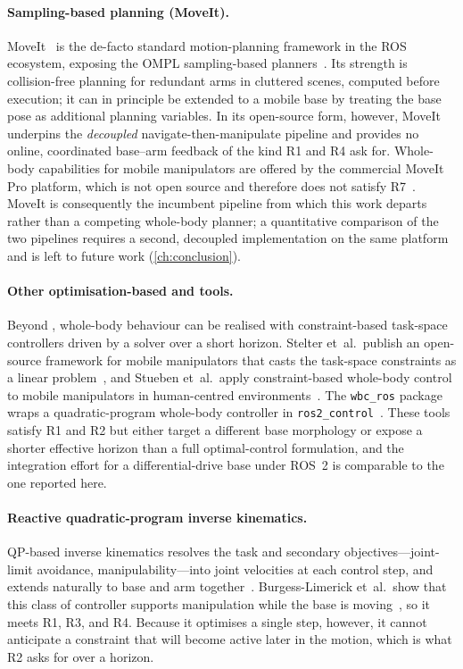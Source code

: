 \paragraph{Sampling-based planning (MoveIt).}
MoveIt~\cite{moveit2} is the de-facto standard motion-planning framework
in the ROS ecosystem, exposing the OMPL sampling-based
planners~\cite{Sucan2012OMPL}. Its strength is collision-free planning
for redundant arms in cluttered scenes, computed before execution; it
can in principle be extended to a mobile base by treating the base pose
as additional planning variables. In its open-source form, however,
MoveIt underpins the \emph{decoupled} navigate-then-manipulate pipeline
and provides no online, coordinated base--arm feedback of the kind R1
and R4 ask for. Whole-body capabilities for mobile manipulators are
offered by the commercial MoveIt Pro platform, which is not open source
and therefore does not satisfy R7~\cite{moveitpro}. MoveIt is
consequently the incumbent pipeline from which this work departs rather
than a competing whole-body planner; a quantitative comparison of the
two pipelines requires a second, decoupled implementation on the same
platform and is left to future work (\cref{ch:conclusion}).

\paragraph{Other optimisation-based and \mpc{} tools.}
Beyond \ocs{}, whole-body behaviour can be realised with constraint-based
task-space controllers driven by a solver over a short horizon. Stelter
et~al.\ publish an open-source framework for mobile manipulators that
casts the task-space constraints as a linear \mpc{}
problem~\cite{Stelter2022OpenSource}, and Stueben et~al.\ apply
constraint-based whole-body control to mobile manipulators in
human-centred environments~\cite{Stueben2021ConstraintWBC}. The
\texttt{wbc\_ros} package wraps a quadratic-program whole-body controller
in \texttt{ros2\_control}~\cite{wbcros}. These tools satisfy R1 and R2
but either target a different base morphology or expose a shorter
effective horizon than a full optimal-control formulation, and the
integration effort for a differential-drive base under ROS~2 is
comparable to the one reported here.

\paragraph{Reactive quadratic-program inverse kinematics.}
QP-based inverse kinematics resolves the \ee{} task and secondary
objectives---joint-limit avoidance, manipulability---into joint
velocities at each control step, and extends naturally to base and arm
together~\cite{Haviland2021NEO,Haviland2022Holistic}. Burgess-Limerick
et~al.\ show that this class of controller supports manipulation while
the base is moving~\cite{BurgessLimerick2024ReactiveBase}, so it meets
R1, R3, and R4. Because it optimises a single step, however, it cannot
anticipate a constraint that will become active later in the motion,
which is what R2 asks for over a horizon.

